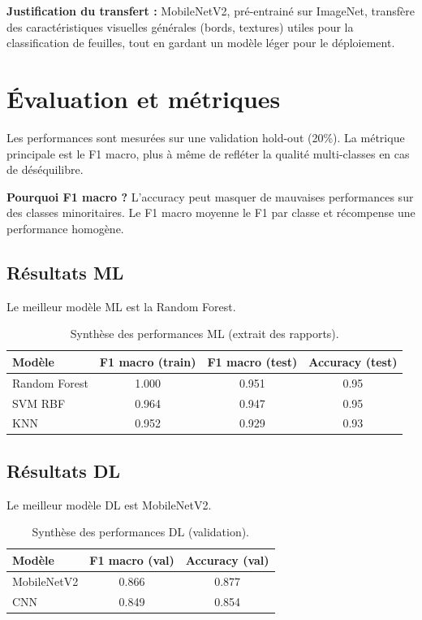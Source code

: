 \documentclass[12pt,a4paper]{article}
\begin{document}
\textbf{Justification du transfert :} MobileNetV2, pr\'e-entrain\'e sur ImageNet, transf\`ere des caract\'eristiques visuelles g\'en\'erales (bords, textures) utiles pour la classification de feuilles, tout en gardant un mod\`ele l\'eger pour le d\'eploiement.

\section{\'Evaluation et m\'etriques}
Les performances sont mesur\'ees sur une validation hold-out (20\%). La m\'etrique principale est le F1 macro, plus \`a m\^eme de refl\'eter la qualit\'e multi-classes en cas de d\'es\'equilibre.

\textbf{Pourquoi F1 macro ?} L'accuracy peut masquer de mauvaises performances sur des classes minoritaires. Le F1 macro moyenne le F1 par classe et r\'ecompense une performance homog\`ene.

\subsection*{R\'esultats ML}
Le meilleur mod\`ele ML est la Random Forest.

\begin{table}[h!]
\centering
\begin{tabular}{lccc}
\toprule
Mod\`ele & F1 macro (train) & F1 macro (test) & Accuracy (test) \\
\midrule
Random Forest & 1.000 & 0.951 & 0.95 \\
SVM RBF & 0.964 & 0.947 & 0.95 \\
KNN & 0.952 & 0.929 & 0.93 \\
\bottomrule
\end{tabular}
\caption{Synth\`ese des performances ML (extrait des rapports).}
\end{table}

\subsection*{R\'esultats DL}
Le meilleur mod\`ele DL est MobileNetV2.

\begin{table}[h!]
\centering
\begin{tabular}{lcc}
\toprule
Mod\`ele & F1 macro (val) & Accuracy (val) \\
\midrule
MobileNetV2 & 0.866 & 0.877 \\
CNN & 0.849 & 0.854 \\
\bottomrule
\end{tabular}
\caption{Synth\`ese des performances DL (validation).}
\end{table}
\end{document}
